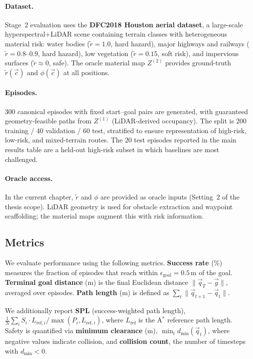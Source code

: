 \paragraph{Dataset.}
Stage~2 evaluation uses the \textbf{DFC2018 Houston aerial dataset},
a large-scale hyperspectral+LiDAR scene containing terrain classes with
heterogeneous material risk:
water bodies ($\tilde{r} = 1.0$, hard hazard),
major highways and railways ($\tilde{r} = 0.8$--$0.9$, hard hazard),
low vegetation ($\tilde{r} = 0.15$, soft risk),
and impervious surfaces ($\tilde{r} \approx 0$, safe).
The oracle material map $Z^{(2)}$ provides ground-truth
$\tilde{r}(\vec{c})$ and $\phi(\vec{c})$ at all positions.

\paragraph{Episodes.}
300 canonical episodes with fixed start–goal pairs are generated, with
guaranteed geometry-feasible paths from $Z^{(1)}$ (LiDAR-derived
occupancy).
The split is 200 training / 40 validation / 60 test, stratified to
ensure representation of high-risk, low-risk, and mixed-terrain routes.
The 20 test episodes reported in the main results table are a
held-out high-risk subset in which baselines are most challenged.

\paragraph{Oracle access.}
In the current chapter, $\tilde{r}$ and $\phi$ are provided
as oracle inputs (Setting~2 of the thesis scope).
LiDAR geometry is used for obstacle extraction and waypoint scaffolding;
the material maps augment this with risk information.
\subsection{Metrics}
\label{subsec:ch6:metrics}

We evaluate performance using the following metrics. \textbf{Success rate} (\%) measures the fraction of episodes that reach within $\epsilon_{\mathrm{goal}} = 0.5\,\text{m}$ of the goal. \textbf{Terminal goal distance} (m) is the final Euclidean distance $\|\vec{q}_T - \vec{g}\|$, averaged over episodes. \textbf{Path length} (m) is defined as $\sum_t \|\vec{q}_{t+1} - \vec{q}_t\|$.

We additionally report \textbf{SPL} (success-weighted path length),\\
$\frac{1}{N}\sum_i S_i \cdot L_{\mathrm{ref},i} / \max(P_i, L_{\mathrm{ref},i})$,
where $L_{\mathrm{ref}}$ is the A$^*$ reference path length. Safety is quantified via \textbf{minimum clearance} (m), $\min_t d_{\min}(\vec{q}_t)$, where negative values indicate collision, and \textbf{collision count}, the number of timesteps with $d_{\min} < 0$.

